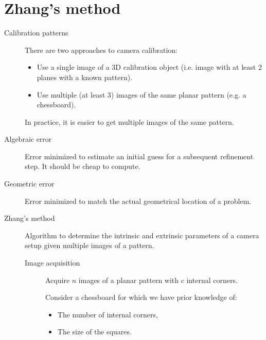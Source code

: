 \section{Zhang's method}

\begin{description}
    \item[Calibration patterns] 
        There are two approaches to camera calibration:
        \begin{itemize}
            \item Use a single image of a 3D calibration object (i.e. image with at least 2 planes with a known pattern).
            \item Use multiple (at least 3) images of the same planar pattern (e.g. a chessboard).
        \end{itemize}

        \begin{remark}
            In practice, it is easier to get multiple images of the same pattern.
        \end{remark}

    \item[Algebraic error] 
        Error minimized to estimate an initial guess for a subsequent refinement step.
        It should be cheap to compute.
    
    \item[Geometric error] 
        Error minimized to match the actual geometrical location of a problem.

    \item[Zhang's method] 
        Algorithm to determine the intrinsic and extrinsic parameters of a camera setup given multiple images of a pattern.

        \begin{description}
            \item[Image acquisition] 
                Acquire $n$ images of a planar pattern with $c$ internal corners.

                Consider a chessboard for which we have prior knowledge of:
                \begin{itemize}
                    \item The number of internal corners,
                    \item The size of the squares.
                \end{itemize}


\end{description}
\end{description}
